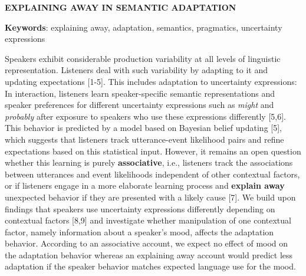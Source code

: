 \documentclass[11pt]{article}
\begin{document}
\thispagestyle{empty}
\begin{center} \textbf{EXPLAINING AWAY IN SEMANTIC ADAPTATION}  \\
\end{center}
\vspace{-1em}
\noindent \textbf{Keywords}: explaining away, adaptation, semantics, pragmatics, uncertainty expressions


\noindent Speakers exhibit considerable production variability at all levels of linguistic representation. Listeners deal with such variability by adapting to it and updating expectations [1-5]. This includes adaptation to uncertainty expressions: In interaction, listeners learn speaker-specific semantic representations and speaker preferences for different uncertainty expressions such as \textit{might} and \textit{probably} after exposure to speakers who use these expressions differently [5,6]. This behavior is predicted by a model based on Bayesian belief updating [5], which suggests that listeners track utterance-event likelihood pairs and refine expectations based on this statistical input. However, it remains an open question whether this learning is purely \textbf{associative}, i.e., listeners track the associations between utterances and event likelihoods independent of other contextual factors, or if listeners engage in a more elaborate learning process and \textbf{explain away} unexpected behavior if they are presented with a likely cause [7].  We build upon findings that speakers use uncertainty expressions differently depending on contextual factors [8,9] and investigate whether manipulation of one contextual factor, namely information about a speaker's mood, affects the adaptation behavior. According to an {associative} account, we expect no effect of mood on the adaptation behavior whereas an {explaining away} account would predict less adaptation if the speaker behavior matches expected language use for the mood. 
\end{document}

